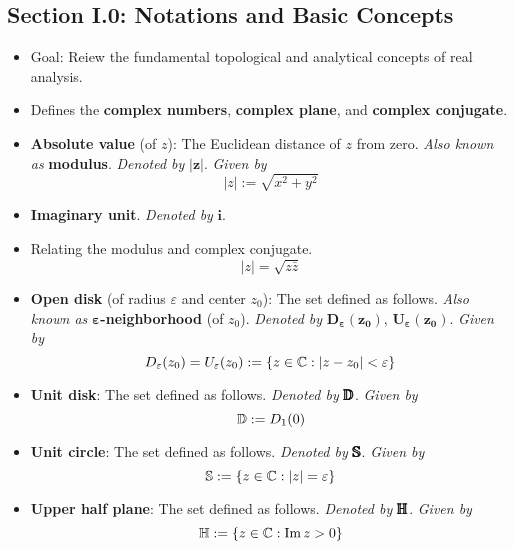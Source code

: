 \documentclass[../notes.tex]{subfiles}
\begin{document}
\subsection*{Section I.0: Notations and Basic Concepts}
\begin{itemize}
    \item Goal: Reiew the fundamental topological and analytical concepts of real analysis.
    \item Defines the \textbf{complex numbers}, \textbf{complex plane}, and \textbf{complex conjugate}.
    \item \textbf{Absolute value} (of $z$): The Euclidean distance of $z$ from zero. \emph{Also known as} \textbf{modulus}. \emph{Denoted by} $\bm{|z|}$. \emph{Given by}
    \begin{equation*}
        |z| := \sqrt{x^2+y^2}
    \end{equation*}
    \item \textbf{Imaginary unit}. \emph{Denoted by} $\bm{i}$.
    \item Relating the modulus and complex conjugate.
    \begin{equation*}
        |z| = \sqrt{z\bar{z}}
    \end{equation*}
    \item \textbf{Open disk} (of radius $\varepsilon$ and center $z_0$): The set defined as follows. \emph{Also known as} \textbf{$\bm{\varepsilon}$-neighborhood} (of $z_0$). \emph{Denoted by} $\bm{D_\varepsilon(z_0)}$, $\bm{U_\varepsilon(z_0)}$. \emph{Given by}
    \begin{equation*}
        D_\varepsilon(z_0) = U_\varepsilon(z_0) := \{z\in\mathbb{C}:|z-z_0|<\varepsilon\}
    \end{equation*}
    \item \textbf{Unit disk}: The set defined as follows. \emph{Denoted by} $\pmb{\mathbb{D}}$. \emph{Given by}
    \begin{equation*}
        \mathbb{D} := D_1(0)
    \end{equation*}
    \item \textbf{Unit circle}: The set defined as follows. \emph{Denoted by} $\pmb{\mathbb{S}}$. \emph{Given by}
    \begin{equation*}
        \mathbb{S} := \{z\in\mathbb{C}:|z|=\varepsilon\}
    \end{equation*}
    \item \textbf{Upper half plane}: The set defined as follows. \emph{Denoted by} $\pmb{\mathbb{H}}$. \emph{Given by}
    \begin{equation*}
        \Hh := \{z\in\C:\im z>0\}

\end{equation*}
\end{itemize}
\end{document}
